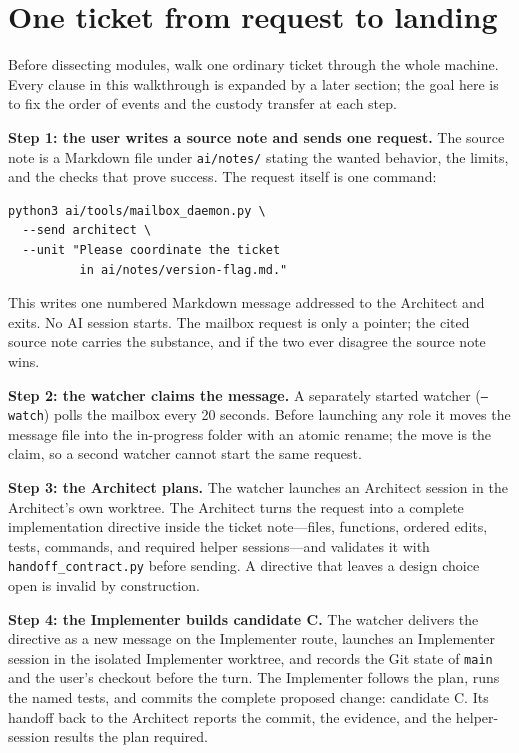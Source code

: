 \documentclass[10pt,aps,prd,twocolumn,nofootinbib]{revtex4-2}
\newcommand{\code}[1]{\texttt{#1}}
\newcommand{\file}[1]{\texttt{#1}}
\begin{document}
\section{One ticket from request to landing}
\label{sec:one-ticket}

Before dissecting modules, walk one ordinary ticket through the whole
machine.  Every clause in this walkthrough is expanded by a later
section; the goal here is to fix the order of events and the custody
transfer at each step.

\textbf{Step 1: the user writes a source note and sends one request.}
The source note is a Markdown file under \file{ai/notes/} stating the
wanted behavior, the limits, and the checks that prove success.  The
request itself is one command:
\begin{verbatim}
python3 ai/tools/mailbox_daemon.py \
  --send architect \
  --unit "Please coordinate the ticket
          in ai/notes/version-flag.md."
\end{verbatim}
This writes one numbered Markdown message addressed to the Architect
and exits.  No AI session starts.  The mailbox request is only a
pointer; the cited source note carries the substance, and if the two
ever disagree the source note wins.

\textbf{Step 2: the watcher claims the message.}  A separately started
watcher (\code{--watch}) polls the mailbox every 20 seconds.  Before
launching any role it moves the message file into the in-progress
folder with an atomic rename; the move is the claim, so a second
watcher cannot start the same request.

\textbf{Step 3: the Architect plans.}  The watcher launches an
Architect session in the Architect's own worktree.  The Architect turns
the request into a complete implementation directive inside the ticket
note---files, functions, ordered edits, tests, commands, and required
helper sessions---and validates it with \file{handoff\_contract.py}
before sending.  A directive that leaves a design choice open is
invalid by construction.

\textbf{Step 4: the Implementer builds candidate C.}  The watcher
delivers the directive as a new message on the Implementer route,
launches an Implementer session in the isolated Implementer worktree,
and records the Git state of \code{main} and the user's checkout before
the turn.  The Implementer follows the plan, runs the named tests, and
commits the complete proposed change: candidate C.  Its handoff back to
the Architect reports the commit, the evidence, and the helper-session
results the plan required.
\end{document}
